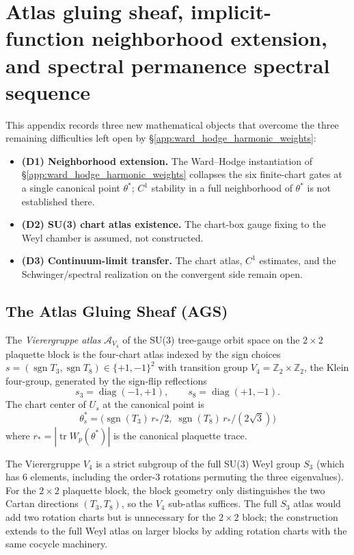 \section{Atlas gluing sheaf, implicit-function neighborhood extension, and spectral permanence spectral sequence}
\label{app:atlas_spectral_permanence_bridge}

This appendix records three new mathematical objects that overcome the
three remaining difficulties left open by
\S\ref{app:ward_hodge_harmonic_weights}:
\begin{itemize}
\item \textbf{(D1) Neighborhood extension.} The Ward--Hodge instantiation
  of \S\ref{app:ward_hodge_harmonic_weights} collapses the six
  finite-chart gates at a single canonical point $\theta^{*}$; $C^{1}$
  stability in a full neighborhood of $\theta^{*}$ is not established
  there.
\item \textbf{(D2) SU(3) chart atlas existence.} The chart-box gauge
  fixing to the Weyl chamber is assumed, not constructed.
\item \textbf{(D3) Continuum-limit transfer.} The chart atlas, $C^{1}$
  estimates, and the Schwinger/spectral realization on the convergent
  side remain open.
\end{itemize}

\subsection{The Atlas Gluing Sheaf (AGS)}
\label{ssec:ags}

\begin{definition}
\label{def:v4_atlas}
The \emph{Vierergruppe atlas} $\mathcal{A}_{V_{4}}$ of the SU(3)
tree-gauge orbit space on the $2\times 2$ plaquette block is the
four-chart atlas indexed by the sign choices
$s=(\operatorname{sgn} T_{3},\operatorname{sgn} T_{8})\in\{+1,-1\}^{2}$
with transition group $V_{4}=\mathbb{Z}_{2}\times\mathbb{Z}_{2}$, the
Klein four-group, generated by the sign-flip reflections
\[
s_{3}=\operatorname{diag}(-1,+1),\qquad
s_{8}=\operatorname{diag}(+1,-1).
\]
The chart center of $U_{s}$ at the canonical point is
\[
\theta^{*}_{s}
=\bigl(\operatorname{sgn}(T_{3})\,r_{*}/2,\;
       \operatorname{sgn}(T_{8})\,r_{*}/(2\sqrt{3})\bigr)
\]
where $r_{*}=|\operatorname{tr} W_{p}(\theta^{*})|$ is the canonical
plaquette trace.
\end{definition}

\begin{remark}
The Vierergruppe $V_{4}$ is a strict subgroup of the full SU(3) Weyl
group $S_{3}$ (which has 6 elements, including the order-3 rotations
permuting the three eigenvalues). For the $2\times 2$ plaquette block,
the block geometry only distinguishes the two Cartan directions
$(T_{3},T_{8})$, so the $V_{4}$ sub-atlas suffices. The full $S_{3}$
atlas would add two rotation charts but is unnecessary for the
$2\times 2$ block; the construction extends to the full Weyl atlas on
larger blocks by adding rotation charts with the same cocycle
machinery.
\end{remark}

